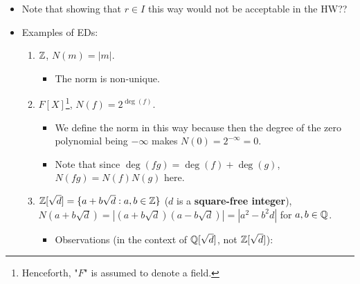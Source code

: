 \documentclass[../notes.tex]{subfiles}
\begin{document}
\begin{itemize}
\begin{proof}
        This proof will use an analogous argument to that used in the proof that $F[X]$ is a PID from the end Lecture 3.1. Let's begin.\par
        To prove that $R$ is a PID, it will suffice show that for every ideal $I\subset R$, $I=(f)$ for some $f\in I$. Let $I\subset R$ be arbitrary. Let
        \begin{equation*}
            d = \min\{N(a):a\in I-\{0\}\}
        \end{equation*}
        Pick $f\in I-\{0\}$ such that $N(f)=d$. We will now argue that $I=(f)$ via a bidirectional inclusion proof. In one direction, since $I$ is an ideal, $(f)=Rf\subset I$. In the other direction, let $h\in I$ be arbitrary. Then since $f\neq 0$ by assumption, the hypothesis that $R$ is an ED implies that there exist $q,r\in R$ such that $h=qf+r$ and $N(r)<N(f)$. It follows since $h,qf\in I$ that $r=h-qf\in I$. But since $N(r)<N(f)=d$, $r\in I$ implies by the definition of $d$ that necessarily $N(r)=0$ and hence $r=0$. Therefore, $h=qf$, as desired.
    \end{proof}
    \item Note that showing that $r\in I$ this way would not be acceptable in the HW??
    \item Examples of EDs:
    \begin{enumerate}
        \item $\mathbb{Z}$, $N(m)=|m|$.
        \begin{itemize}
            \item The norm is non-unique.
        \end{itemize}
        \item $F[X]$\footnote{Henceforth, "$F$" is assumed to denote a field.}, $N(f)=2^{\deg(f)}$.
        \begin{itemize}
            \item We define the norm in this way because then the degree of the zero polynomial being $-\infty$ makes $N(0)=2^{-\infty}=0$.
            \item Note that since $\deg(fg)=\deg(f)+\deg(g)$, $N(fg)=N(f)N(g)$ here.
        \end{itemize}
        \item $\mathbb{Z}[\sqrt{d}]=\{a+b\sqrt{d}:a,b\in\mathbb{Z}\}$ ($d$ is a \textbf{square-free integer}), $N(a+b\sqrt{d})=|(a+b\sqrt{d})(a-b\sqrt{d})|=|a^2-b^2d|$ for $a,b\in\mathbb{Q}$.
        \begin{itemize}
            \item Observations (in the context of $\mathbb{Q}[\sqrt{d}]$, not $\mathbb{Z}[\sqrt{d}]$):

\end{itemize}
\end{enumerate}
\end{itemize}
\end{document}
